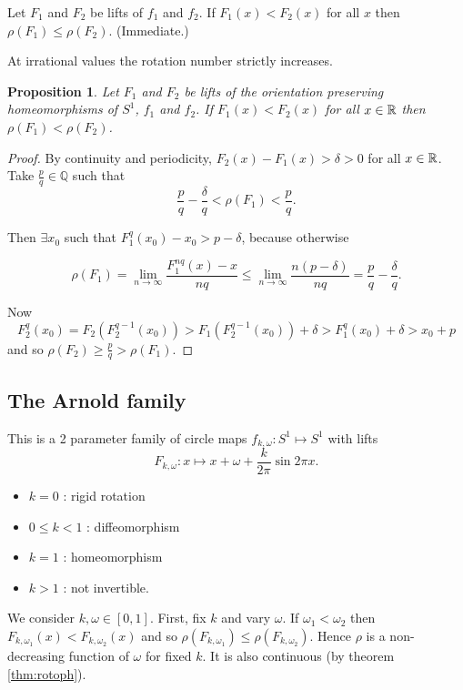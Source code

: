 \documentclass{notes}
\newcommand{\Q}{\mathbb{Q}}
\theoremstyle{plain}
\newtheorem{proposition}{Proposition}[chapter]
\begin{document}
Let $F_1$ and $F_2$ be lifts of $f_1$ and $f_2$.  If $F_1(x) < F_2(x)$
for all $x$ then $\rho(F_1) \le \rho(F_2)$.  (Immediate.)

At irrational values the rotation number strictly increases.

\begin{proposition}
  Let $F_1$ and $F_2$ be lifts of the orientation preserving
  homeomorphisms of $S^1$, $f_1$ and $f_2$.  If $F_1(x) < F_2(x)$ for all
  $x \in \mathbb{R}$ then $\rho(F_1) < \rho(F_2)$.
\end{proposition}

\begin{proof}
  By continuity and periodicity, $F_2(x) - F_1(x) > \delta > 0$ for all
  $x \in \mathbb{R}$.  Take $\tfrac{p}{q} \in \Q$ such that
\[
\frac{p}{q} - \frac{\delta}{q} < \rho(F_1) < \frac{p}{q}.
\]

Then $\exists x_0$ such that $F_1^q(x_0) - x_0 > p - \delta$, because
otherwise

\[
\rho(F_1) = \lim_{n \to \infty} \frac{F_1^{nq}(x) - x}{n q} \le
\lim_{n \to \infty} \frac{n (p-\delta)}{n q} = \frac{p}{q} -
\frac{\delta}{q}.
\]

Now
\[
F_2^q(x_0) = F_2(F_2^{q-1}(x_0)) > F_1(F_2^{q-1}(x_0)) + \delta
> F_1^q(x_0) + \delta > x_0 + p
\]
and so $\rho(F_2) \ge \tfrac{p}{q} > \rho(F_1)$.
\end{proof}

\subsection{The Arnold family}

This is a 2 parameter family of circle maps $f_{k,\omega} \colon S^1
\mapsto S^1$ with lifts
\[
F_{k,\omega} \colon x \mapsto x + \omega + \frac{k}{2 \pi} \sin 2 \pi x.
\]

\begin{itemize}
\item $k=0$ : rigid rotation
\item $0 \le k < 1$ : diffeomorphism
\item $k = 1$ : homeomorphism
\item $k > 1$ : not invertible.
\end{itemize}

We consider $k,\omega \in [0,1]$.  First, fix $k$ and vary $\omega$.
If $\omega_1 < \omega_2$ then $F_{k,\omega_1}(x) < F_{k,\omega_2}(x)$
and so $\rho(F_{k,\omega_1}) \le \rho(F_{k,\omega_2})$.  Hence $\rho$
is a non-decreasing function of $\omega$ for fixed $k$.  It is also
continuous (by theorem \ref{thm:rotoph}).
\end{document}
